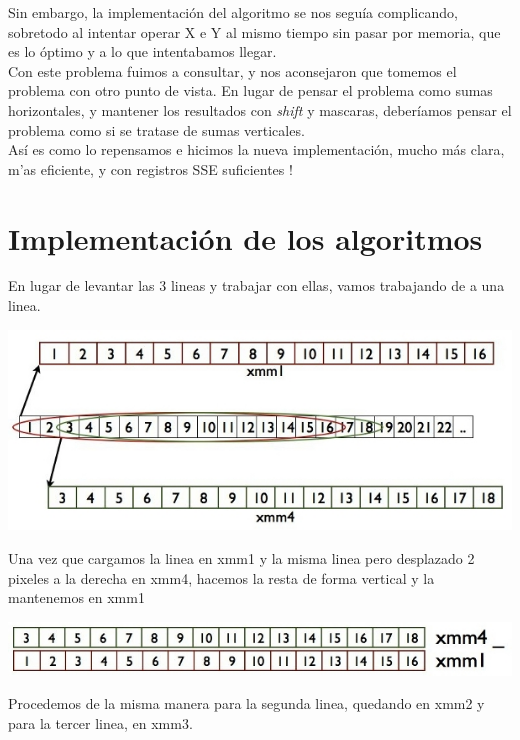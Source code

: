 \documentclass[a4paper, 10pt]{article}
\begin{document}
Sin embargo, la implementaci\'on del algoritmo se nos segu\'ia complicando, sobretodo al intentar operar X e Y al mismo tiempo sin pasar por memoria, que es lo \'optimo y a lo que intentabamos llegar. \\

Con este problema fuimos a consultar, y nos aconsejaron que tomemos el problema con otro punto de vista.
En lugar de pensar el problema como sumas horizontales, y mantener los resultados con \textit{shift} y mascaras, deber\'iamos pensar el problema como si se tratase de sumas verticales. \\

As\'i es como lo repensamos e hicimos la nueva implementaci\'on, mucho m\'as clara, m'as eficiente, y con registros SSE suficientes !

\newpage

\section{Implementaci\'on de los algoritmos}

En lugar de levantar las 3 lineas y trabajar con ellas, vamos trabajando de a una linea.

\begin{center}
	\includegraphics[scale=0.70]{Graficos/graph2.jpg}
\end{center}

Una vez que cargamos la linea en xmm1 y la misma linea pero desplazado 2 pixeles a la derecha en xmm4, hacemos la resta de forma vertical y la mantenemos en xmm1

\begin{center}
	\includegraphics[scale=0.7]{Graficos/graph3.jpg}
\end{center}

Procedemos de la misma manera para la segunda linea, quedando en xmm2 y para la tercer linea, en xmm3.
\end{document}
